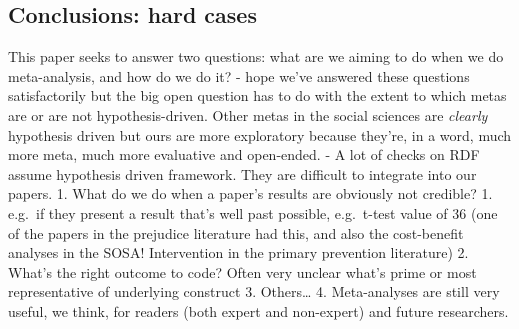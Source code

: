 \documentclass[
  man]{apa6}
\begin{document}
\subsection{Conclusions: hard cases}\label{conclusions-hard-cases}

This paper seeks to answer two questions: what are we aiming to do when we do meta-analysis, and how do we do it?
- hope we've answered these questions satisfactorily but the big open question has to do with the extent to which metas are or are not hypothesis-driven. Other metas in the social sciences are \emph{clearly} hypothesis driven but ours are more exploratory because they're, in a word, much more meta, much more evaluative and open-ended.
- A lot of checks on RDF assume hypothesis driven framework. They are difficult to integrate into our papers.
1. What do we do when a paper's results are obviously not credible?
1. e.g.~if they present a result that's well past possible, e.g.~t-test value of 36 (one of the papers in the prejudice literature had this, and also the cost-benefit analyses in the SOSA! Intervention in the primary prevention literature)
2. What's the right outcome to code? Often very unclear what's prime or most representative of underlying construct
3. Others\ldots{}
4. Meta-analyses are still very useful, we think, for readers (both expert and non-expert) and future researchers.
\end{document}
